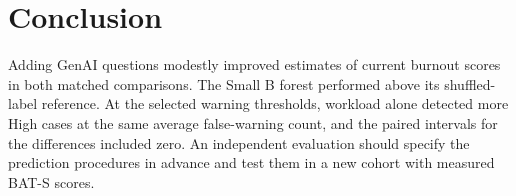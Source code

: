 \section{Conclusion}
\label{sec:conclusion}

Adding GenAI questions modestly improved estimates of current burnout scores in both matched comparisons. The Small B forest performed above its shuffled-label reference. At the selected warning thresholds, workload alone detected more High cases at the same average false-warning count, and the paired intervals for the differences included zero. An independent evaluation should specify the prediction procedures in advance and test them in a new cohort with measured BAT-S scores.

